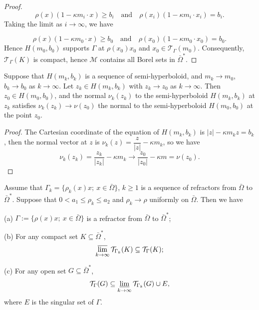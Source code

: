 \documentclass[a4paper,12pt,]{article}
\newtheorem{lemma}{\hskip\parindent\bf Lemma}[section]%
\numberwithin{equation}{section}
\numberwithin{equation}{section} \allowdisplaybreaks
\begin{document}
\begin{proof}
  $$\rho(x)(1 - \kappa m_{i} \cdot x) \geq b_{i} \quad \text{and} \quad \rho(x_{i})(1 - \kappa m_{i} \cdot x_{i}) = b_{i}.$$
  Taking the limit as $i \rightarrow \infty$, we have

  $$\rho(x)(1 - \kappa m_{0} \cdot x) \geq b_{0} \quad \text{and} \quad \rho(x_{0})(1 - \kappa m_{0} \cdot x_{0}) = b_{0}.$$
  Hence $H(m_{0},b_{0})$ supports $\Gamma$ at $\rho(x_{0})x_{0}$ and $x_{0} \in \mathcal{T}_{\Gamma}(m_{0})$. Consequently, $\mathcal{T}_{\Gamma}(K)$ is compact, hence $\mathcal{M}$ contains all Borel sets in $\bar{\Omega}^{\ast}$.
\end{proof}

\begin{lemma}
  Suppose that $H(m_{k},b_{k})$ is a sequence of semi-hyperboloid, and $m_{k} \rightarrow m_{0}$, $b_{k} \rightarrow b_{0}$ as $k\rightarrow \infty$. Let $z_{k} \in H(m_{k},b_{k})$ with $z_{k} \rightarrow z_{0}$ as $k\rightarrow \infty$. Then $z_{0} \in H(m_{0},b_{0})$, and the normal $\nu_{k}(z_{k})$ to the semi-hyperboloid $H(m_{k},b_{k})$ at $z_{k}$ satisfies $\nu_{k}(z_{k}) \rightarrow \nu(z_{0})$ the normal to the semi-hyperboloid $H(m_{0},b_{0})$ at the point $z_{0}$.
  \label{lem3.5}
\end{lemma}

\begin{proof}
  The Cartesian coordinate of the equation of $H(m_{k},b_{k})$ is $\vert z \vert - \kappa m_{k}z = b_{k}$, then the normal vector at $z$ is $\nu_{k}(z) = \dfrac{z}{\vert z \vert} - \kappa m_{k}$, so we have
  $$\nu_{k}(z_{k}) = \frac{z_{k}}{\vert z_{k} \vert} - \kappa m_{k} \rightarrow \frac{z_{0}}{\vert z_{0} \vert} - \kappa m = \nu(z_{0}).$$
\end{proof}

\begin{lemma}
  Assume that $\Gamma_{k} = \{\rho_{k}(x)x;~x\in \bar{\Omega}\}$, $k \geq 1$ is a sequence of refractors from $\bar{\Omega}$ to $\bar{\Omega}^{\ast}$. Suppose that $0<a_{1}\leq \rho_{k} \leq a_{2}$ and $\rho_{k} \rightarrow \rho$ uniformly on $\bar{\Omega}$. Then we have
  
   (a) $\Gamma := \{\rho(x)x;~x\in \bar{\Omega}\}$ is a refractor from $\bar{\Omega}$ to $\bar{\Omega}^{\ast}$;
  
   (b) For any compact set $K\subseteq \bar{\Omega}^{\ast}$,
  $$\varlimsup_{k\rightarrow \infty} \mathcal{T}_{\Gamma_{k}}(K) \subseteq \mathcal{T}_{\Gamma}(K);$$
  
   (c) For any open set $G \subseteq \bar{\Omega}^{\ast}$,
  $$\mathcal{T}_{\Gamma}(G) \subseteq \varliminf_{k\rightarrow \infty}\mathcal{T}_{\Gamma_{k}}(G) \cup E,$$
  where $E$ is the singular set of $\Gamma$.
  \label{lem3.6}
\end{lemma}
\end{document}
